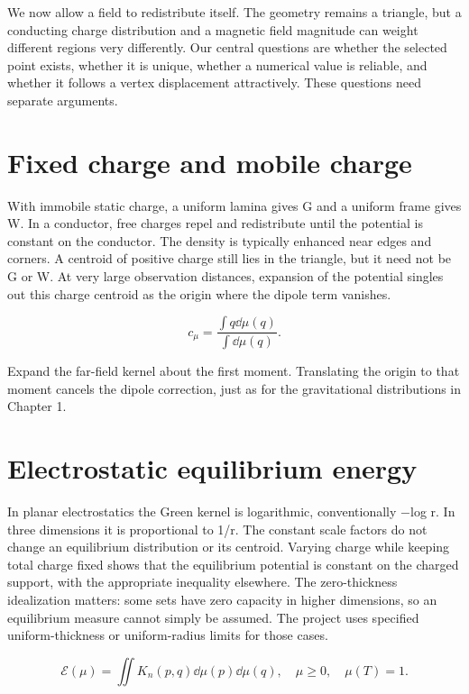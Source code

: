 \documentclass[11pt,oneside,openany]{book}
\begin{document}
We now allow a field to redistribute itself. The geometry remains a triangle, but a conducting charge distribution and a magnetic field magnitude can weight different regions very differently. Our central questions are whether the selected point exists, whether it is unique, whether a numerical value is reliable, and whether it follows a vertex displacement attractively. These questions need separate arguments.


\section{Fixed charge and mobile charge}\label{sec:slide17}

With immobile static charge, a uniform lamina gives G and a uniform frame gives W. In a conductor, free charges repel and redistribute until the potential is constant on the conductor. The density is typically enhanced near edges and corners. A centroid of positive charge still lies in the triangle, but it need not be G or W. At very large observation distances, expansion of the potential singles out this charge centroid as the origin where the dipole term vanishes.


\[c_\mu=\frac{\int q\dd\mu(q)}{\int\dd\mu(q)}.\]


Expand the far-field kernel about the first moment. Translating
the origin to that moment cancels the dipole correction, just as for
the gravitational distributions in Chapter 1.



\section{Electrostatic equilibrium energy}\label{sec:slide18}

In planar electrostatics the Green kernel is logarithmic, conventionally \ensuremath{-}log r. In three dimensions it is proportional to 1/r. The constant scale factors do not change an equilibrium distribution or its centroid. Varying charge while keeping total charge fixed shows that the equilibrium potential is constant on the charged support, with the appropriate inequality elsewhere. The zero-thickness idealization matters: some sets have zero capacity in higher dimensions, so an equilibrium measure cannot simply be assumed. The project uses specified uniform-thickness or uniform-radius limits for those cases.


\[\mathcal E(\mu)=\iint K_n(p,q)\dd\mu(p)\dd\mu(q),\quad\mu\ge0,\quad\mu(T)=1.\]
\end{document}
